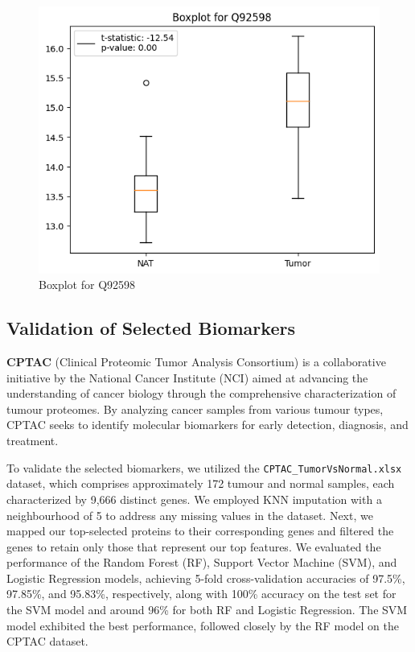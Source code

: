 \documentclass[a4paper,12pt]{article}
\begin{document}
\begin{figure}[H]
\begin{minipage}[b]{0.4\textwidth}
	\end{minipage}
	\hfill
	\begin{minipage}[b]{0.4\textwidth}
		\centering
		\includegraphics[width=\textwidth]{images/5.png}
		\caption{Boxplot for Q92598}

		\label{fig:boxplot_P51888}
	\end{minipage}
\end{figure}





\subsection{Validation of Selected Biomarkers}

\textbf{CPTAC} (Clinical Proteomic Tumor Analysis Consortium) is a collaborative initiative by the National Cancer Institute (NCI) aimed at advancing the understanding of cancer biology through the comprehensive characterization of tumour proteomes. By analyzing cancer samples from various tumour types, CPTAC seeks to identify molecular biomarkers for early detection, diagnosis, and treatment.

To validate the selected biomarkers, we utilized the \texttt{CPTAC\_TumorVsNormal.xlsx} dataset, which comprises approximately 172 tumour and normal samples, each characterized by 9,666 distinct genes. We employed KNN imputation with a neighbourhood of 5 to address any missing values in the dataset. Next, we mapped our top-selected proteins to their corresponding genes and filtered the genes to retain only those that represent our top features. We evaluated the performance of the Random Forest (RF), Support Vector Machine (SVM), and Logistic Regression models, achieving 5-fold cross-validation accuracies of 97.5\%, 97.85\%, and 95.83\%, respectively, along with 100\% accuracy on the test set for the SVM model and around 96\% for both RF and Logistic Regression. The SVM model exhibited the best performance, followed closely by the RF model on the CPTAC dataset.
\end{document}
